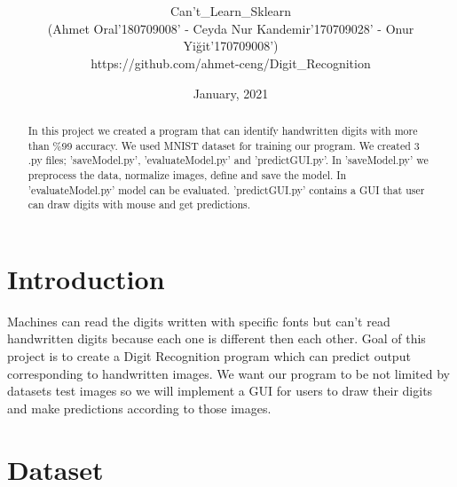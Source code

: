 \documentclass[onecolumn]{article}
\title{\spacecaps{DIGIT RECOGNITION REPORT}\\ \normalsize \spacesc{Ceng 3521, Data Mining} }
\author{Can't\_Learn\_Sklearn\\(Ahmet Oral'180709008' - Ceyda Nur Kandemir'170709028' - Onur Yiğit'170709008')\\https://github.com/ahmet-ceng/Digit\_Recognition}
\date{January, 2021}
\begin{document}
\maketitle

\begin{abstract}
In this project we created a program that can identify handwritten digits with more than \%99 accuracy. We used MNIST dataset for training our program. We created 3 .py files; 'saveModel.py', 'evaluateModel.py' and 'predictGUI.py'. In 'saveModel.py' we preprocess the data, normalize images, define and save the model. In 'evaluateModel.py' model can be evaluated. 'predictGUI.py' contains a GUI that user can draw digits with mouse and get predictions.
\end{abstract}

\section{Introduction}
Machines can read the digits written with specific fonts but can't read handwritten digits because each one is different then each other. Goal of this project is to create a Digit Recognition program which can predict output corresponding to handwritten images. We want our program to be not limited by datasets test images so we will implement a GUI for users to draw their digits and make predictions according to those images.



\section{Dataset}
\end{document}
